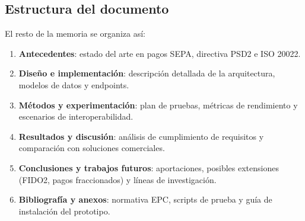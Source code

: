 \subsection{Estructura del documento}
\label{subsec:Estructura}
El resto de la memoria se organiza así:
\begin{enumerate}
  \item \textbf{Antecedentes}: estado del arte en pagos SEPA, directiva PSD2 e ISO 20022.
  \item \textbf{Diseño e implementación}: descripción detallada de la arquitectura, modelos de datos y endpoints.
  \item \textbf{Métodos y experimentación}: plan de pruebas, métricas de rendimiento y escenarios de interoperabilidad.
  \item \textbf{Resultados y discusión}: análisis de cumplimiento de requisitos y comparación con soluciones comerciales.
  \item \textbf{Conclusiones y trabajos futuros}: aportaciones, posibles extensiones (FIDO2, pagos fraccionados) y líneas de investigación.
  \item \textbf{Bibliografía y anexos}: normativa EPC, scripts de prueba y guía de instalación del prototipo.
\end{enumerate}
